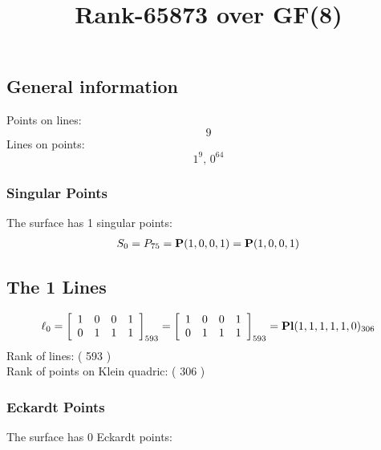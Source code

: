 \documentclass{article}
\newcommand\setTBstruts{\def\T{\rule{0pt}{2.6ex}}%
\def\B{\rule[-1.2ex]{0pt}{0pt}}}
\newcommand{\bP}{{\bf P}}
\begin{document}
 
\setTBstruts



{\allowdisplaybreaks%






\title{Rank-65873 over GF(8)}
\author{}%
\maketitle%
%
{}



\subsection*{General information}
Points on lines:
$$
9$$
Lines on points:
$$
1^9,\,0^{64}$$
\subsubsection*{Singular Points}
The surface has 1 singular points:\\
\begin{align*}
S_{0} &= P_{75}=\bP(1, 0, 0, 1) = \bP(1, 0, 0, 1)\\
\end{align*}
\subsection*{The 1 Lines}
$$
\ell_{0} = 
\left[
\begin{array}{*{4}{r}}
1 & 0 & 0 & 1\\
0 & 1 & 1 & 1\\
\end{array}
\right]
_{593}
=
\left[
\begin{array}{*{4}c}
1  & 0  & 0  & 1\\
0  & 1  & 1  & 1\\
\end{array}
\right]_{593}
={\rm\bf Pl}(1,1,1,1,1,0 )_{306}$$
Rank of lines: ( 593 )\\
Rank of points on Klein quadric: ( 306 )\\
\subsubsection*{Eckardt Points}
The surface has 0 Eckardt points:\\
}
\end{document}
